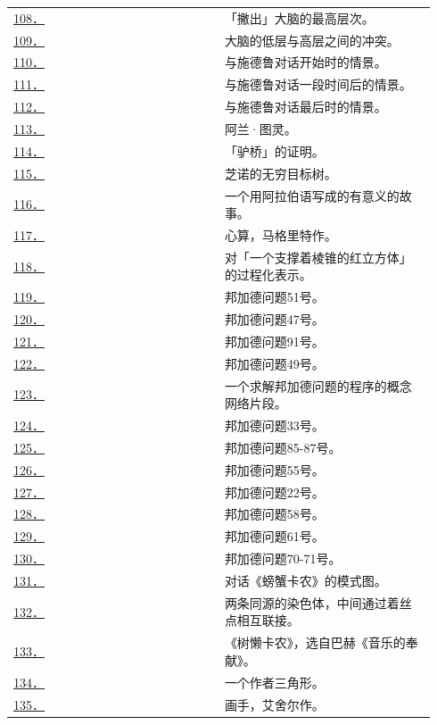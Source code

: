 \documentclass[
  12pt,
  twoside,
  openright,
  oldfontcommands,
]{memoir}
\begin{document}
\begin{longtable}[]{>{\raggedright\arraybackslash}p{0.47\linewidth} >{\raggedright\arraybackslash}p{0.47\linewidth}}
\hyperref[fig:108]{108．} & 「撇出」大脑的最高层次。 \\
\hyperref[fig:109]{109．} & 大脑的低层与高层之间的冲突。 \\
\hyperref[fig:110]{110．} & 与施德鲁对话开始时的情景。 \\
\hyperref[fig:111]{111．} & 与施德鲁对话一段时间后的情景。 \\
\hyperref[fig:112]{112．} & 与施德鲁对话最后时的情景。 \\
\hyperref[fig:113]{113．} & 阿兰·图灵。 \\
\hyperref[fig:114]{114．} & 「驴桥」的证明。 \\
\hyperref[fig:115]{115．} & 芝诺的无穷目标树。 \\
\hyperref[fig:116]{116．} & 一个用阿拉伯语写成的有意义的故事。 \\
\hyperref[fig:117]{117．} & 心算，马格里特作。 \\
\hyperref[fig:118]{118．} & 对「一个支撑着棱锥的红立方体」的过程化表示。 \\
\hyperref[fig:119]{119．} & 邦加德问题51号。 \\
\hyperref[fig:120]{120．} & 邦加德问题47号。 \\
\hyperref[fig:121]{121．} & 邦加德问题91号。 \\
\hyperref[fig:122]{122．} & 邦加德问题49号。 \\
\hyperref[fig:123]{123．} & 一个求解邦加德问题的程序的概念网络片段。 \\
\hyperref[fig:124]{124．} & 邦加德问题33号。 \\
\hyperref[fig:125]{125．} & 邦加德问题85-87号。 \\
\hyperref[fig:126]{126．} & 邦加德问题55号。 \\
\hyperref[fig:127]{127．} & 邦加德问题22号。 \\
\hyperref[fig:128]{128．} & 邦加德问题58号。 \\
\hyperref[fig:129]{129．} & 邦加德问题61号。 \\
\hyperref[fig:130]{130．} & 邦加德问题70-71号。 \\
\hyperref[fig:131]{131．} & 对话《螃蟹卡农》的模式图。 \\
\hyperref[fig:132]{132．} & 两条同源的染色体，中间通过着丝点相互联接。 \\
\hyperref[fig:133]{133．} & 《树懒卡农》，选自巴赫《音乐的奉献》。 \\
\hyperref[fig:134]{134．} & 一个作者三角形。 \\
\hyperref[fig:135]{135．} & 画手，艾舍尔作。 \\

\end{longtable}
\end{document}
